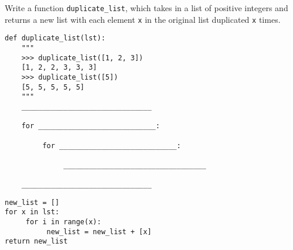 \begin{blocksection}
\question Write a function \lstinline{duplicate_list}, which takes in a list of positive integers and returns a new list with each element \lstinline{x} in the original list duplicated \lstinline{x} times.

\begin{lstlisting}
def duplicate_list(lst):
    """
    >>> duplicate_list([1, 2, 3])
    [1, 2, 2, 3, 3, 3]
    >>> duplicate_list([5])
    [5, 5, 5, 5, 5]
    """
    _______________________________
    
    for ____________________________:

         for ____________________________:

              __________________________________

    _______________________________

\end{lstlisting}

\begin{solution}
\begin{lstlisting}
new_list = []
for x in lst:
     for i in range(x):
          new_list = new_list + [x]
return new_list
\end{lstlisting}
\end{solution}
\end{blocksection}

